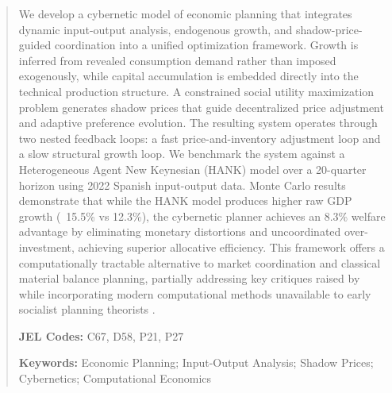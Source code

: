 \begin{abstract}
We develop a cybernetic model of economic planning that
integrates dynamic input-output analysis, endogenous growth, and
shadow-price-guided coordination into a unified optimization framework.
Growth is inferred from revealed consumption demand rather than imposed
exogenously, while capital accumulation is embedded directly into the
technical production structure.
A constrained social utility maximization problem generates shadow
prices that guide decentralized price adjustment and adaptive preference
evolution.
The resulting system operates through two nested feedback loops: a fast
price-and-inventory adjustment loop and a slow structural growth loop.
We benchmark the system against a Heterogeneous Agent New Keynesian (HANK) 
model over a 20-quarter horizon using 2022 Spanish input-output data. 
Monte Carlo results demonstrate that while the HANK model produces 
higher raw GDP growth (~15.5\% vs 12.3\%), the cybernetic planner 
achieves an 8.3\% welfare advantage by eliminating monetary 
distortions and uncoordinated over-investment, achieving superior 
allocative efficiency.
This framework offers a computationally tractable alternative to market
coordination and classical material balance planning, partially addressing key
critiques raised by \citet{hayek1945use} while incorporating modern
computational methods unavailable to early socialist planning theorists
\citep{lange1936economic,taylor1929guidance}.

\medskip
\noindent\textbf{JEL Codes:}  C67, D58, P21, P27

\noindent\textbf{Keywords:} Economic Planning; Input-Output Analysis;
Shadow Prices; Cybernetics; Computational Economics
\end{abstract}